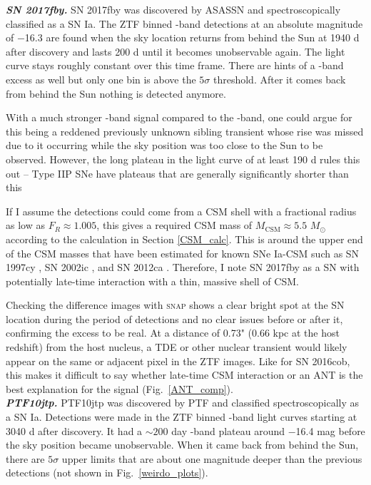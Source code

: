 \documentclass[a4paper,oneside,12pt, class=Latex/Classes/PhDthesisPSnPDF, crop=false]{standalone}
\begin{document}
\textit{\textbf{SN 2017fby.}}
SN 2017fby was discovered by ASASSN and spectroscopically classified as a SN Ia. The ZTF binned \ztfr-band detections at an absolute magnitude of $-$16.3 are found when the sky location returns from behind the Sun at 1940 d after discovery and lasts 200 d until it becomes unobservable again. The light curve stays roughly constant over this time frame. There are hints of a \ztfg-band excess as well but only one bin is above the $5\sigma$ threshold. After it comes back from behind the Sun nothing is detected anymore.

With a much stronger \ztfr-band signal compared to the \ztfg-band, one could argue for this being a reddened previously unknown sibling transient whose rise was missed due to it occurring while the sky position was too close to the Sun to be observed. However, the long plateau in the light curve of at least 190 d rules this out -- Type IIP SNe have plateaus that are generally significantly shorter than this \citep{IIL_IIP, SN_II_V_band_lcs}

If I assume the detections could come from a CSM shell with a fractional radius as low as $F_R \approx 1.005$, this gives a required CSM mass of $M_\text{CSM} \approx 5.5$ $M_\odot$ according to the calculation in Section \ref{CSM_calc}. This is around the upper end of the CSM masses that have been estimated for known SNe Ia-CSM such as SN 1997cy \citep{Chugai_2004}, SN 2002ic \citep{Chugai_2004, Inserra_2016}, and SN 2012ca \citep{Inserra_2016}. Therefore, I note SN 2017fby as a SN with potentially late-time interaction with a thin, massive shell of CSM.

Checking the difference images with \textsc{snap} shows a clear bright spot at the SN location during the period of detections and no clear issues before or after it, confirming the excess to be real. At a distance of 0.73" (0.66 kpc at the host redshift) from the host nucleus, a TDE or other nuclear transient would likely appear on the same or adjacent pixel in the ZTF images. Like for SN 2016cob, this makes it difficult to say whether late-time CSM interaction or an ANT is the best explanation for the signal (Fig.~\ref{ANT_comp}).\\


\textit{\textbf{PTF10jtp.}}
PTF10jtp was discovered by PTF and classified spectroscopically as a SN Ia. Detections were made in the ZTF binned \ztfr-band light curves starting at 3040 d after discovery. It had a $\sim 200$ day \ztfr-band plateau around $-$16.4 mag before the sky position became unobservable. When it came back from behind the Sun, there are $5\sigma$ upper limits that are about one magnitude deeper than the previous detections (not shown in Fig.~\ref{weirdo_plots}). 
\end{document}
